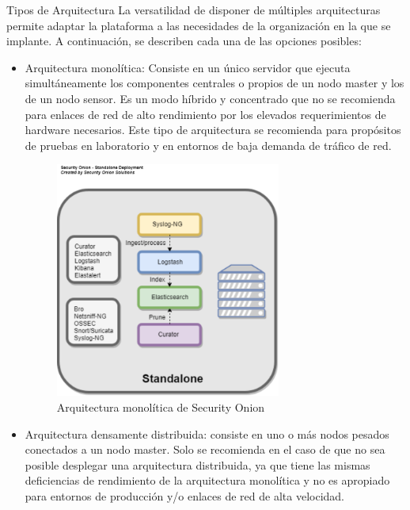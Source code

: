     \begin{subsubsection}{Tipos de Arquitectura}
      La versatilidad de disponer de múltiples arquitecturas permite adaptar la plataforma a las necesidades de la organización en la que se implante. A continuación, se describen cada una de las opciones posibles:
    \begin{itemize}
         \item Arquitectura monolítica: Consiste en un único servidor que ejecuta simultáneamente los componentes centrales o propios de un nodo master y los de un nodo sensor. Es un modo híbrido y concentrado que no se recomienda para enlaces de red de alto rendimiento por los elevados requerimientos de hardware necesarios. 
         Este tipo de arquitectura se recomienda para propósitos de pruebas en laboratorio y en entornos de baja demanda de tráfico de red.
        \begin{figure}[H]
            \centering
            \includegraphics[width=0.7\textwidth]{./iteracion_1_imagenes/figura_17_arq_monolitica_sonion.png}
            \caption{Arquitectura monolítica de Security Onion\cite{sonion}}
            \label{fig:arq_monolitica_sonion}
        \end{figure}
        \FloatBarrier
        \pagebreak
        \item Arquitectura densamente distribuida: consiste en uno o más nodos pesados conectados a un nodo master. Solo se recomienda en el caso de que no sea posible desplegar una arquitectura distribuida, ya que tiene las mismas deficiencias de rendimiento de la arquitectura monolítica y no es apropiado para entornos de producción y/o enlaces de red de alta velocidad.

\end{itemize}
\end{subsubsection}
